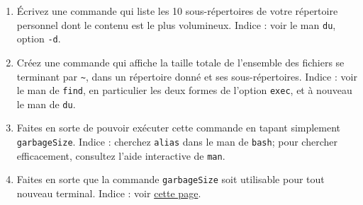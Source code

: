 \documentclass[a4paper]{article}
\begin{document}
\begin{enumerate}
\item Écrivez une commande qui liste les 10 sous-répertoires de votre
  répertoire personnel dont le contenu est le plus volumineux. Indice
  : voir le man \texttt{du}, option \texttt{-d}.
\item Créez une commande qui affiche la taille totale de l'ensemble
  des fichiers se terminant par \texttt{\~}, dans un répertoire donné
  et ses sous-répertoires. Indice : voir le man de \texttt{find}, en
  particulier les deux formes de l'option \texttt{exec}, et à nouveau
  le man de \texttt{du}.
\item Faites en sorte de pouvoir exécuter cette commande en tapant
  simplement \texttt{garbageSize}. Indice : cherchez \texttt{alias}
  dans le man de \texttt{bash}; pour chercher efficacement, consultez
  l'aide interactive de \texttt{man}.
\item Faites en sorte que la commande \texttt{garbageSize} soit
  utilisable pour tout nouveau terminal. Indice : voir
  \href{https://www.gnu.org/software/bash/manual/html_node/Bash-Startup-Files.html}{cette
    page}.
\end{enumerate}
\end{document}
